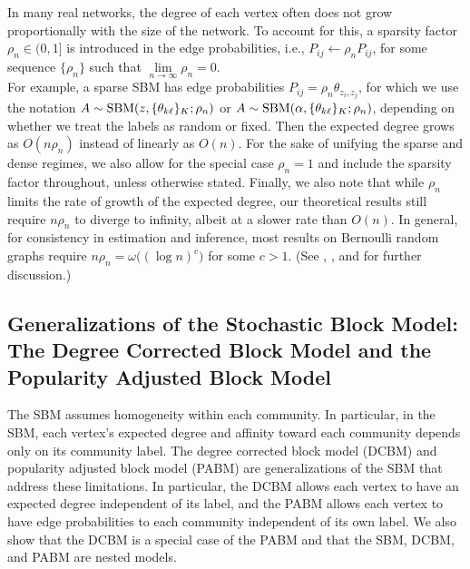 \documentclass[
  11pt,
]{article}
\theoremstyle{definition}
\theoremstyle{definition}
\theoremstyle{definition}
\theoremstyle{definition}
\theoremstyle{remark}
\begin{document}
In many real networks, the degree of each vertex often does not grow proportionally with the size of the network.
To account for this, a sparsity factor \(\rho_n \in (0, 1]\) is introduced in the edge probabilities, i.e., \(P_{ij} \leftarrow \rho_n P_{ij}\), for some sequence \(\{\rho_n\}\) such that \(\lim\limits_{n \to \infty} \rho_n = 0\).\\
For example, a sparse SBM has edge probabilities \(P_{ij} = \rho_n \theta_{z_i, z_j}\), for which we use the notation \(A \sim \mathrm{SBM}(z, \{\theta_{k \ell}\}_K; \rho_n)\) or \(A \sim \mathrm{SBM}(\alpha, \{\theta_{k \ell}\}_K; \rho_n)\), depending on whether we treat the labels as random or fixed.
Then the expected degree grows as \(O(n \rho_n)\) instead of linearly as \(O(n)\).
For the sake of unifying the sparse and dense regimes, we also allow for the special case \(\rho_n = 1\) and include the sparsity factor throughout, unless otherwise stated.
Finally, we also note that while \(\rho_n\) limits the rate of growth of the expected degree, our theoretical results still require \(n \rho_n\) to diverge to infinity, albeit at a slower rate than \(O(n)\).
In general, for consistency in estimation and inference, most results on Bernoulli random graphs require \(n \rho_n = \omega \big( (\log n)^c \big)\) for some \(c > 1\).
(See \cite{JMLR:v18:16-480}, \cite{https://doi.org/10.48550/arxiv.2106.09840}, and \cite{rubindelanchy2017statistical} for further discussion.)

\hypertarget{sec:dcbm-pabm}{%
\subsection{Generalizations of the Stochastic Block Model: The Degree Corrected Block Model and the Popularity Adjusted Block Model}\label{sec:dcbm-pabm}}

The SBM assumes homogeneity within each community.
In particular, in the SBM, each vertex's expected degree and affinity toward each community depends only on its community label.
The degree corrected block model (DCBM) and popularity adjusted block model (PABM) are generalizations of the SBM that address these limitations.
In particular, the DCBM allows each vertex to have an expected degree independent of its label, and the PABM allows each vertex to have edge probabilities to each community independent of its own label.
We also show that the DCBM is a special case of the PABM and that the SBM, DCBM, and PABM are nested models.
\end{document}
